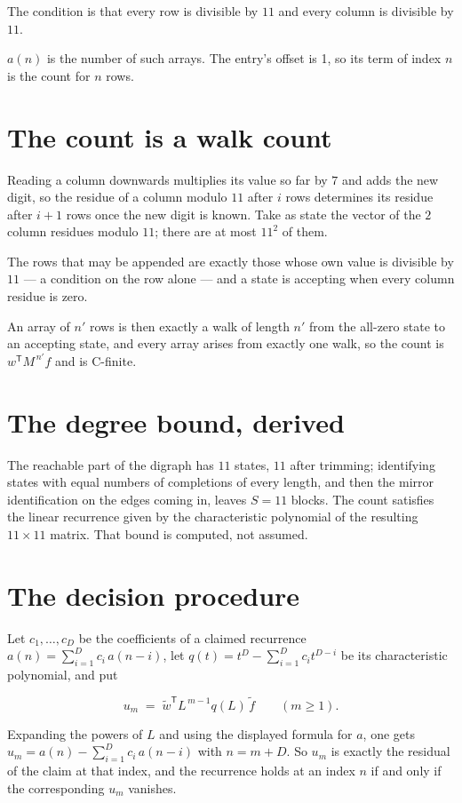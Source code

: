 \documentclass[11pt]{article}
\theoremstyle{definition}
\begin{document}
The condition is that every row is divisible by $11$ and every column is divisible by $11$.

$a(n)$ is the number of such arrays. The entry's offset is 1, so its term of index $n$ is the count for $n$ rows.

\section{The count is a walk count}

Reading a column downwards multiplies its value so far by $7$ and adds the new digit, so the residue of a column modulo $11$ after $i$ rows determines its residue after $i+1$ rows once the new digit is known. Take as state the vector of the $2$ column residues modulo $11$; there are at most $11^{2}$ of them.

The rows that may be appended are exactly those whose own value is divisible by $11$ --- a condition on the row alone --- and a state is accepting when every column residue is zero.

An array of $n'$ rows is then exactly a walk of length $n'$ from the all-zero state to an accepting state, and every array arises from exactly one walk, so the count is $w^{\mathsf T}M^{\,n'}f$ and is C-finite.

\section{The degree bound, derived}

The reachable part of the digraph has $11$ states, $11$ after trimming; identifying states with equal numbers of completions of every length, and then the mirror identification on the edges coming in, leaves $S = 11$ blocks. The count satisfies the linear recurrence given by the characteristic polynomial of the resulting $11\times11$ matrix. That bound is computed, not assumed.

\section{The decision procedure}

Let $c_1,\dots,c_D$ be the coefficients of a claimed recurrence $a(n) = \sum_{i=1}^{D} c_i\,a(n-i)$, let $q(t) = t^{D} - \sum_{i=1}^{D} c_i t^{D-i}$ be its characteristic polynomial, and put

\[u_m \;=\; \tilde w^{\mathsf T} L^{\,m-1} q(L)\,\tilde f \qquad (m \ge 1).\]

Expanding the powers of $L$ and using the displayed formula for $a$, one gets $u_m = a(n) - \sum_{i=1}^{D} c_i\,a(n-i)$ with $n = m + D$. So $u_m$ is exactly the residual of the claim at that index, and the recurrence holds at an index $n$ if and only if the corresponding $u_m$ vanishes.
\end{document}
